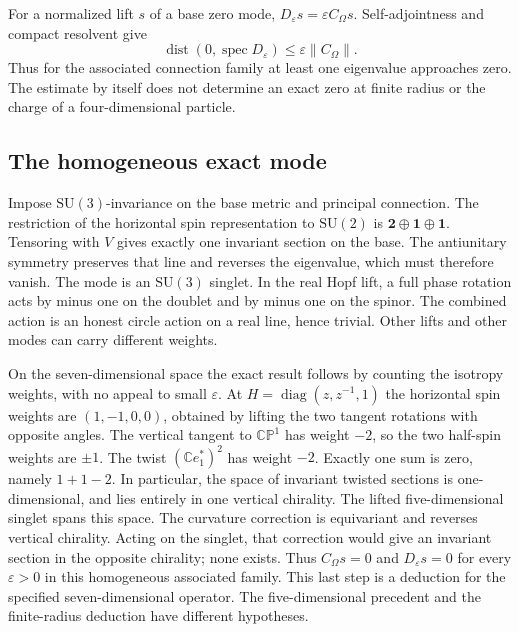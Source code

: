 \documentclass[11pt,oneside]{article}
\newcommand{\C}{\mathbb C}
\newcommand{\CP}{\mathbb{CP}}
\newcommand{\SU}{\mathrm{SU}}
\begin{document}
For a normalized lift \(s\) of a base zero mode, \(D_\varepsilon s=\varepsilon C_\Omega s\). Self-adjointness and compact resolvent give
\[
 \operatorname{dist}(0,\operatorname{spec}D_\varepsilon)
 \leq \varepsilon\|C_\Omega\| .
\]
Thus for the associated connection family at least one eigenvalue approaches zero. The estimate by itself does not determine an exact zero at finite radius or the charge of a four-dimensional particle.

\subsection*{The homogeneous exact mode}
Impose \(\SU(3)\)-invariance on the base metric and principal connection. The restriction of the horizontal spin representation to \(\SU(2)\) is \(\mathbf 2\oplus\mathbf 1\oplus\mathbf 1\). Tensoring with \(V\) gives exactly one invariant section on the base. The antiunitary symmetry preserves that line and reverses the eigenvalue, which must therefore vanish. The mode is an \(\SU(3)\) singlet. In the real Hopf lift, a full phase rotation acts by minus one on the doublet and by minus one on the spinor. The combined action is an honest circle action on a real line, hence trivial. Other lifts and other modes can carry different weights.

On the seven-dimensional space the exact result follows by counting the isotropy weights, with no appeal to small \(\varepsilon\). At \(H=\operatorname{diag}(z,z^{-1},1)\) the horizontal spin weights are \((1,-1,0,0)\), obtained by lifting the two tangent rotations with opposite angles. The vertical tangent to \(\CP^1\) has weight \(-2\), so the two half-spin weights are \(\pm1\). The twist \((\C e_1^*)^2\) has weight \(-2\). Exactly one sum is zero, namely \(1+1-2\). In particular, the space of invariant twisted sections is one-dimensional, and lies entirely in one vertical chirality. The lifted five-dimensional singlet spans this space. The curvature correction is equivariant and reverses vertical chirality. Acting on the singlet, that correction would give an invariant section in the opposite chirality; none exists. Thus \(C_\Omega s=0\) and \(D_\varepsilon s=0\) for every \(\varepsilon>0\) in this homogeneous associated family. This last step is a deduction for the specified seven-dimensional operator. The five-dimensional precedent and the finite-radius deduction have different hypotheses.
\end{document}
